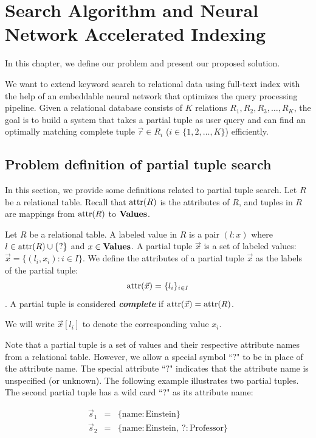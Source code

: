 \chapter{Search Algorithm and Neural Network Accelerated Indexing}

In this chapter, we define our problem and present our proposed solution.

 We want to extend keyword search to relational data using full-text index with the help of an embeddable neural network that optimizes the query processing pipeline. 
Given a relational database consists of $K$ relations $R_1, R_2, R_3, \dots, R_K$, the goal is to build a system that takes a partial tuple as user query and can find an optimally matching complete tuple $\vec r \in R_i$ ($i \in \{1, 2, \dots, K\}$) efficiently.

\section{Problem definition of partial tuple search}
In this section, we provide some definitions related to partial tuple search.
Let $R$ be a relational table.  Recall that $\operatorname{attr}(R)$ is the attributes of $R$, and tuples in $R$ are mappings from $\operatorname{attr}(R)$ to $\mathbf{Values}$.

\begin{definition}
Let $R$ be a relational table.  A labeled value in $R$ is a pair $(l:x)$ where 
$l\in\operatorname{attr}(R)\cup\{?\}$ and $x\in\mathbf{Values}$.  A partial tuple $\vec{x}$ is a set of labeled values: $\vec x = \{(l_i, x_i): i\in I\}$.  We define the attributes of a partial tuple $\vec x$ as the labels of the partial tuple:
$$\operatorname{attr}(\vec x) = \{l_i\}_{i\in I}$$.
A partial tuple is considered {\bf\em complete} if $\operatorname{attr}(\vec x) = \operatorname{attr}(R)$.
\end{definition}

We will write $\vec x[l_i]$ to denote the corresponding value $x_i$.

Note that a partial tuple is a set of values and their respective attribute names from a relational table.  However, we allow a special symbol ``$?$" to be in place of the attribute name.  The special attribute ``$?$" indicates that the attribute name is unspecified (or unknown). The following example illustrates two partial tuples. The second partial tuple has a wild card ``?" as its attribute name:

\begin{example}
\begin{eqnarray*}
\vec s_1 &=& \{\mathrm{name}:\mathrm{Einstein}\} \\
\vec s_2 &=& \{\mathrm{name}:\mathrm{Einstein},\ \mathrm{?}: \mathrm{Professor}\}
\end{eqnarray*}
\end{example}

